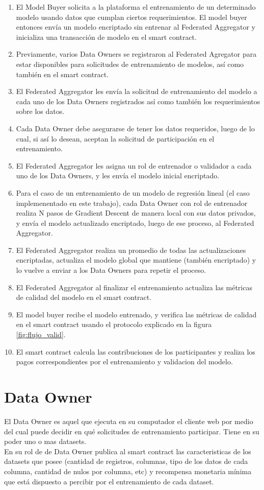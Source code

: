 \documentclass[
11pt, %
oneside, %
spanish, %
singlespacing, %
parskip, %
headsepline, %
chapterinoneline, %
]{MastersDoctoralThesis} %
\begin{document}
\begin{enumerate}
\item El Model Buyer solicita a la plataforma el entrenamiento de un determinado modelo usando datos que cumplan ciertos requerimientos. El model buyer entonces envía un modelo encriptado sin entrenar al Federated Aggregator y inicializa una transacción de modelo en el smart contract.
\item Previamente, varios Data Owners se registraron al Federated Agregator para estar disponibles para solicitudes de entrenamiento de modelos, así como también en el smart contract.
\item El Federated Aggregator les envía la solicitud de entrenamiento del modelo a cada uno de los Data Owners registrados así como también los requerimientos sobre los datos.
\item Cada Data Owner debe asegurarse de tener los datos requeridos, luego de lo cual, si así lo desean, aceptan la solicitud de participación en el entrenamiento.
\item El Federated Aggregator les asigna un rol de entrenador o validador a cada uno de los Data Owners, y les envía el modelo inicial encriptado.
\item Para el caso de un entrenamiento de un modelo de regresión lineal (el caso implemenentado en este trabajo), cada Data Owner con rol de entrenador realiza N pasos de Gradient Descent de manera local con sus datos privados, y envía el modelo actualizado encriptado, luego de ese proceso, al Federated Aggregator.
\item El Federated Aggregator realiza un promedio de todas las actualizaciones encriptadas, actualiza el modelo global que mantiene (también encriptado) y lo vuelve a enviar a los Data Owners para repetir el proceso.
\item El Federated Aggregator al finalizar el entrenamiento actualiza las métricas de calidad del modelo en el smart contract.
\item El model buyer recibe el modelo entrenado, y verifica las métricas de calidad en el smart contract usando el protocolo explicado en la figura \ref{fig:flujo_valid}.
\item El smart contract calcula las contribuciones de los participantes y realiza los pagos correspondientes por el entrenamiento y validacion del modelo.
\end{enumerate}


\section{Data Owner}
\justify
El Data Owner es aquel que ejecuta en su computador el cliente web por medio del cual puede decidir en qué solicitudes de entrenamiento participar. Tiene en su poder uno o mas datasets. \\
En su rol de de Data Owner publica al smart contract las caracteristicas de los datasets que posee (cantidad de registros, columnas, tipo de los datos de cada columna, cantidad de nulos por columna, etc) y recompensa monetaria mínima que está dispuesto a percibir por el entrenamiento de cada dataset.
\end{document}
